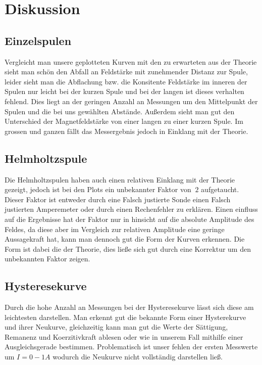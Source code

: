 \section{Diskussion}
\label{sec:Diskussion}

\subsection{Einzelspulen} %
    Vergleicht man unsere geplotteten Kurven mit den zu erwarteten aus der Theorie sieht man schön den Abfall an Feldstärke mit zunehmender Distanz zur Spule, leider sieht man die Abflachung bzw. die
    Konsitente Feldstärke im inneren der Spulen nur leicht bei der kurzen Spule und bei der langen ist dieses verhalten fehlend. Dies liegt an der geringen Anzahl an Messungen um den Mittelpunkt der Spulen
    und die bei uns gewählten Abstände. Außerdem sieht man gut den Unterschied der Magnetfeldstärke von einer langen zu einer kurzen Spule.
    Im grossen und ganzen fällt das Messergebnis jedoch in Einklang mit der Theorie.
\label{sub:DisEinzelspulen}


\subsection{Helmholtzspule} %
    Die Helmholtzspulen haben auch einen relativen Einklang mit der Theorie gezeigt, jedoch ist bei den Plots ein unbekannter Faktor von $~2$ aufgetaucht. Dieser Faktor ist entweder durch eine Falsch justierte Sonde
    einen Falsch justierten Amperemeter oder durch einen Rechenfehler zu erklären. Einen einfluss auf die Ergebnisse hat der Faktor nur in hinsicht auf die absolute Amplitude des Feldes, da diese
    aber im Vergleich zur relativen Amplitude eine geringe Aussagekraft hat, kann man dennoch gut die Form der Kurven erkennen. Die Form ist dabei die der Theorie, dies ließe sich gut 
    durch eine Korrektur um den unbekannten Faktor zeigen.
\label{sub:DisHelmholtzspule}


\subsection{Hysteresekurve} %
    Durch die hohe Anzahl an Messungen bei der Hysteresekurve lässt sich diese am leichtesten darstellen. Man erkennt gut die bekannte Form einer Hysterekurve und ihrer Neukurve, gleichzeitig kann
    man gut die Werte der Sättigung, Remanenz und Koerzitivkraft ablesen oder wie in unserem Fall mithilfe einer Ausgleichsgerade bestimmen. Problematisch ist unser fehlen der ersten Messwerte um $I=0-1\unit{A}$
    wodurch die Neukurve nicht vollständig darstellen ließ.
\label{sub:DisHysteresekurve}

